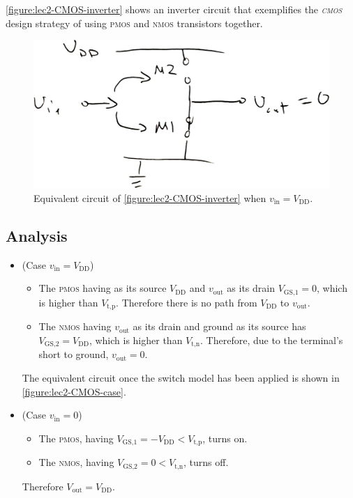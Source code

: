 \autoref{figure:lec2-CMOS-inverter} shows an inverter circuit that exemplifies the \textsc{\em cmos} design strategy of using \textsc{pmos} and \textsc{nmos} transistors together.

\begin{figure}
  \centering
  \includegraphics[width=0.75\linewidth]{figures/CMOS-case}
  \caption{Equivalent circuit of \autoref{figure:lec2-CMOS-inverter}
  when \(v_\text{in} = V_\text{DD}\).}
  \label{figure:lec2-CMOS-case}
\end{figure}

\subsection{Analysis}
\begin{itemize}
  \item
  (Case \(v_\text{in} = V_\text{DD}\))
  \begin{itemize}
    \item
    The \textsc{pmos} having as its source \(V_\text{DD}\) and \(v_\text{out}\) as its drain
    \(V_\text{GS,1} = 0\), which is higher than \(V_\text{t,p}\).
    Therefore there is no path from \(V_\text{DD}\) to \(v_\text{out}\).
    \item
    The \textsc{nmos} having \(v_\text{out}\) as its drain and ground as its source has \(V_\text{GS,2}= V_\text{DD}\),
    which is higher than \(V_\text{t,n}\).
    Therefore, due to the terminal's short to ground, \(v_\text{out} = 0\).
  \end{itemize}
  The equivalent circuit once the switch model has been applied is shown in  \autoref{figure:lec2-CMOS-case}.

  \item
  (Case \(v_\text{in} = 0\))
  \begin{itemize}
      \item
      The \textsc{pmos}, having \(V_\text{GS,1} = -V_\text{DD} < V_\text{t,p}\), turns on.
      \item
      The \textsc{nmos}, having \(V_\text{GS,2} = 0 < V_\text{t,n}\), turns off.
  \end{itemize}
  Therefore \(V_\text{out} = V_\text{DD}\).
\end{itemize}

